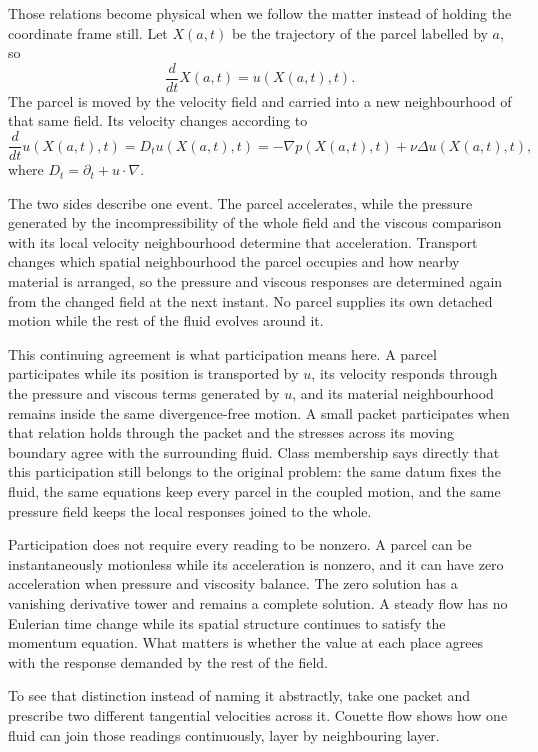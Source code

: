 
Those relations become physical when we follow the matter instead of holding the coordinate frame still.
Let \(X(a,t)\) be the trajectory of the parcel labelled by \(a\), so
\[
  \frac{d}{dt}X(a,t)
  =
  u(X(a,t),t).
\]
The parcel is moved by the velocity field and carried into a new neighbourhood of that same field.
Its velocity changes according to
\[
  \frac{d}{dt}u(X(a,t),t)
  =
  D_tu(X(a,t),t)
  =
  -\nabla p(X(a,t),t)
  +
  \nu\Delta u(X(a,t),t),
\]
where \(D_t=\partial_t+u\cdot\nabla\).

The two sides describe one event.
The parcel accelerates, while the pressure generated by the incompressibility of the whole field and the viscous comparison with its local velocity neighbourhood determine that acceleration.
Transport changes which spatial neighbourhood the parcel occupies and how nearby material is arranged, so the pressure and viscous responses are determined again from the changed field at the next instant.
No parcel supplies its own detached motion while the rest of the fluid evolves around it.

This continuing agreement is what participation means here.
A parcel participates while its position is transported by \(u\), its velocity responds through the pressure and viscous terms generated by \(u\), and its material neighbourhood remains inside the same divergence-free motion.
A small packet participates when that relation holds through the packet and the stresses across its moving boundary agree with the surrounding fluid.
Class membership says directly that this participation still belongs to the original problem: the same datum fixes the fluid, the same equations keep every parcel in the coupled motion, and the same pressure field keeps the local responses joined to the whole.

Participation does not require every reading to be nonzero.
A parcel can be instantaneously motionless while its acceleration is nonzero, and it can have zero acceleration when pressure and viscosity balance.
The zero solution has a vanishing derivative tower and remains a complete solution.
A steady flow has no Eulerian time change while its spatial structure continues to satisfy the momentum equation.
What matters is whether the value at each place agrees with the response demanded by the rest of the field.

To see that distinction instead of naming it abstractly, take one packet and prescribe two different tangential velocities across it.
Couette flow shows how one fluid can join those readings continuously, layer by neighbouring layer.
